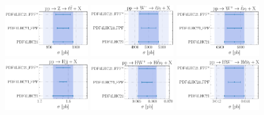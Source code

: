 \begin{figure}[t]
	\centering
	\includegraphics[width=0.32\textwidth]{plots/LHCpheno/NNPDF_DY_14TEV_40_PHENO-integrated-pdf4lhc21.pdf}
	\includegraphics[width=0.32\textwidth]{plots/LHCpheno/NNPDF_WM_14TEV_40_PHENO-integrated-pdf4lhc21.pdf}
	\includegraphics[width=0.32\textwidth]{plots/LHCpheno/NNPDF_WP_14TEV_40_PHENO-integrated-pdf4lhc21.pdf}
	\includegraphics[width=0.32\textwidth]{plots/LHCpheno/NNPDF_HVBF_14TEV_40_PHENO-integrated-pdf4lhc21.pdf}
	\includegraphics[width=0.32\textwidth]{plots/LHCpheno/NNPDF_HWP_14TEV_40_PHENO-integrated-pdf4lhc21.pdf}
	\includegraphics[width=0.32\textwidth]{plots/LHCpheno/NNPDF_HWM_14TEV_40_PHENO-integrated-pdf4lhc21.pdf}

\end{figure}
